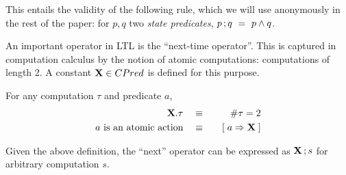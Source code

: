 This entails the validity of the following rule, which we will use
anonymously in the rest of the paper: for $p, q$ two \emph{state
  predicates}, $p \, ; q ~=~ p \land q$.


An important operator in LTL is the ``next-time operator''.   This is
captured in computation calculus by the notion of atomic computations:
computations of length 2.  A constant $\mathbf{X} \in CPred$ is defined for
this purpose.
\begin{Definition} For any computation $\tau$ and
  predicate $a$,
  \begin{eqnarray}
    \mathbf{X}.\tau  & ~~~\equiv~~~ & \# \tau = 2  \label{eq:comp-next} \\
    \textrm{$a$ is an atomic action} & ~~~\equiv~~~ & [\; a \Rightarrow \mathbf{X} \;] 
  \end{eqnarray}
\end{Definition}
Given the above definition, the ``next'' operator can be expressed
as $\mathbf{X}\,;s$ for arbitrary computation $s$.


